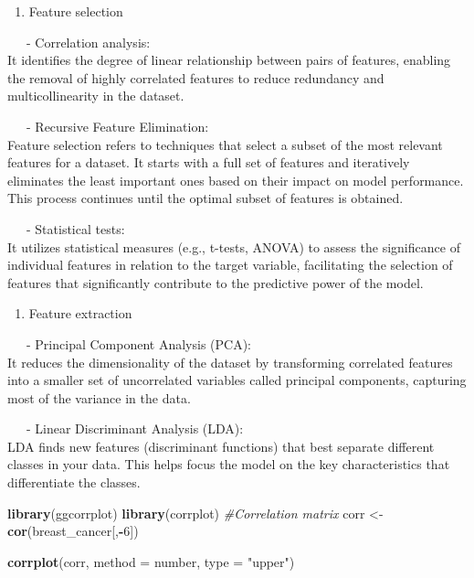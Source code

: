 \documentclass[
]{book}
\newenvironment{Shaded}{\begin{snugshade}}{\end{snugshade}}
\newcommand{\AttributeTok}[1]{\textcolor[rgb]{0.13,0.29,0.53}{#1}}
\newcommand{\CommentTok}[1]{\textcolor[rgb]{0.56,0.35,0.01}{\textit{#1}}}
\newcommand{\DecValTok}[1]{\textcolor[rgb]{0.00,0.00,0.81}{#1}}
\newcommand{\FunctionTok}[1]{\textcolor[rgb]{0.13,0.29,0.53}{\textbf{#1}}}
\newcommand{\NormalTok}[1]{#1}
\newcommand{\OtherTok}[1]{\textcolor[rgb]{0.56,0.35,0.01}{#1}}
\newcommand{\SpecialCharTok}[1]{\textcolor[rgb]{0.81,0.36,0.00}{\textbf{#1}}}
\newcommand{\StringTok}[1]{\textcolor[rgb]{0.31,0.60,0.02}{#1}}
\providecommand{\tightlist}{%
  \setlength{\itemsep}{0pt}\setlength{\parskip}{0pt}}
\begin{document}
\begin{enumerate}
\def\labelenumi{\arabic{enumi}.}
\tightlist
\item
  Feature selection
\end{enumerate}

~~~- Correlation analysis:\\
It identifies the degree of linear relationship between pairs of features, enabling the removal of highly correlated features to reduce redundancy and multicollinearity in the dataset.

~~~- Recursive Feature Elimination:\\
Feature selection refers to techniques that select a subset of the most relevant features for a dataset. It starts with a full set of features and iteratively eliminates the least important ones based on their impact on model performance. This process continues until the optimal subset of features is obtained.

~~~- Statistical tests:\\
It utilizes statistical measures (e.g., t-tests, ANOVA) to assess the significance of individual features in relation to the target variable, facilitating the selection of features that significantly contribute to the predictive power of the model.

\begin{enumerate}
\def\labelenumi{\arabic{enumi}.}
\setcounter{enumi}{1}
\tightlist
\item
  Feature extraction
\end{enumerate}

~~~- Principal Component Analysis (PCA):\\
It reduces the dimensionality of the dataset by transforming correlated features into a smaller set of uncorrelated variables called principal components, capturing most of the variance in the data.

~~~- Linear Discriminant Analysis (LDA):\\
LDA finds new features (discriminant functions) that best separate different classes in your data. This helps focus the model on the key characteristics that differentiate the classes.

\begin{Shaded}
\begin{Highlighting}[]
\FunctionTok{library}\NormalTok{(ggcorrplot)}
\FunctionTok{library}\NormalTok{(corrplot)}
\CommentTok{\#Correlation matrix}
\NormalTok{corr }\OtherTok{\textless{}{-}} \FunctionTok{cor}\NormalTok{(breast\_cancer[,}\SpecialCharTok{{-}}\DecValTok{6}\NormalTok{])}

\FunctionTok{corrplot}\NormalTok{(corr, }\AttributeTok{method =} \StringTok{\textquotesingle{}number\textquotesingle{}}\NormalTok{, }\AttributeTok{type =} \StringTok{"upper"}\NormalTok{)}
\end{Highlighting}
\end{Shaded}
\end{document}
